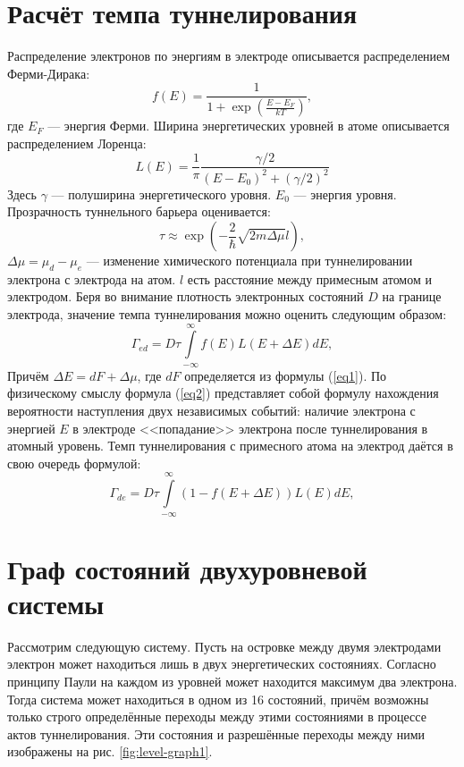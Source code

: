 \documentclass[12pt,a4paper]{report}
\begin{document}
\section{Расчёт темпа туннелирования}
Распределение электронов по энергиям в электроде описывается
распределением Ферми-Дирака:
\begin{equation}
f(E)= \frac{1}{1+\exp(\frac{E-E_F}{kT})},
\end{equation}
где $E_F$ — энергия Ферми.
Ширина энергетических уровней в атоме описывается распределением Лоренца:
\begin{equation}
L(E)=\frac{1}{\pi}\frac{\gamma/2}{(E-E_0)^2+(\gamma/2)^2}
\end{equation}
Здесь $\gamma$ — полуширина энергетического уровня. $E_0$ — энергия уровня. Прозрачность туннельного барьера оценивается:
\begin{equation}
\tau \approx \exp(-\frac{2}{\hbar}\sqrt{2m\Delta\mu}l),
\end{equation}
$\Delta\mu = \mu_d - \mu_e$ — изменение химического потенциала при туннелировании электрона с электрода на атом. $l$ есть расстояние между примесным атомом и электродом. Беря во внимание плотность электронных состояний $D$ на границе электрода, значение темпа туннелирования можно оценить следующим образом:
\begin{equation}\label{eq2}
\Gamma_{ed} = D\tau \int\limits_{-\infty}^{\infty}f(E)L(E + \Delta E) dE,
\end{equation} 
Причём $\Delta E = dF + \Delta \mu$, где $dF$ определяется из формулы (\ref{eq1}).
По физическому смыслу формула (\ref{eq2}) представляет собой формулу нахождения вероятности наступления двух независимых событий: наличие электрона с энергией $E$ в электроде <<попадание>> электрона после туннелирования в атомный уровень. Темп туннелирования с примесного атома на электрод даётся в свою очередь формулой:
\begin{equation}\label{eq4}
\Gamma_{de} = D\tau \int\limits_{-\infty}^{\infty}(1 - f(E + \Delta E))L(E) dE,
\end{equation}

\section{Граф состояний двухуровневой системы}
Рассмотрим следующую систему. Пусть на островке между двумя электродами электрон может находиться лишь в двух энергетических состояниях. Согласно принципу Паули на каждом из уровней может находится максимум два электрона. Тогда система может находиться в одном из 16 состояний, причём возможны только строго определённые переходы между этими состояниями в процессе актов туннелирования. Эти состояния и разрешённые переходы между ними изображены на рис. \ref{fig:level-graph1}.
\end{document}
